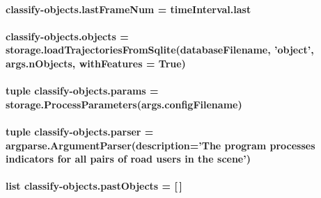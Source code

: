 \hypertarget{namespaceclassify-objects_ade30e76ac38705c0657407fed60aa3fe}{
\paragraph[{last\-Frame\-Num}]{\setlength{\rightskip}{0pt plus 5cm}classify-\/objects.\-last\-Frame\-Num = time\-Interval.\-last}}\label{namespaceclassify-objects_ade30e76ac38705c0657407fed60aa3fe}
\hypertarget{namespaceclassify-objects_a826dcbf61bf85134c0020343aa29b2b4}{
\paragraph[{objects}]{\setlength{\rightskip}{0pt plus 5cm}classify-\/objects.\-objects = {\bf storage.\-load\-Trajectories\-From\-Sqlite}({\bf database\-Filename}, 'object', args.\-n\-Objects, with\-Features = True)}}\label{namespaceclassify-objects_a826dcbf61bf85134c0020343aa29b2b4}
\hypertarget{namespaceclassify-objects_a113b526a5c5fb0c4d8c825cf04475d5e}{
\paragraph[{params}]{\setlength{\rightskip}{0pt plus 5cm}tuple classify-\/objects.\-params = {\bf storage.\-Process\-Parameters}(args.\-config\-Filename)}}\label{namespaceclassify-objects_a113b526a5c5fb0c4d8c825cf04475d5e}
\hypertarget{namespaceclassify-objects_a7b796869625c671d0bd8b25189e0947b}{
\paragraph[{parser}]{\setlength{\rightskip}{0pt plus 5cm}tuple classify-\/objects.\-parser = argparse.\-Argument\-Parser(description='The program processes indicators for all pairs of road users in the scene')}}\label{namespaceclassify-objects_a7b796869625c671d0bd8b25189e0947b}
\hypertarget{namespaceclassify-objects_a09225cc5985019451088fff6618bdd15}{
\paragraph[{past\-Objects}]{\setlength{\rightskip}{0pt plus 5cm}list classify-\/objects.\-past\-Objects = \mbox{[}$\,$\mbox{]}}}\label{namespaceclassify-objects_a09225cc5985019451088fff6618bdd15}
